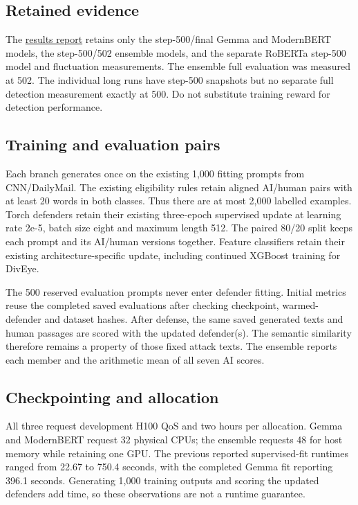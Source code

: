 \subsection{Retained
evidence}\label{record-docs-defender-comparison-md-retained-evidence}

The \href{records/docs/research_results.tex}{results report} retains
only the step-500/final Gemma and ModernBERT models, the step-500/502
ensemble models, and the separate RoBERTa step-500 model and fluctuation
measurements. The ensemble full evaluation was measured at 502. The
individual long runs have step-500 snapshots but no separate full
detection measurement exactly at 500. Do not substitute training reward
for detection performance.

\subsection{Training and evaluation
pairs}\label{record-docs-defender-comparison-md-training-and-evaluation-pairs}

Each branch generates once on the existing 1,000 fitting prompts from
CNN/DailyMail. The existing eligibility rules retain aligned AI/human
pairs with at least 20 words in both classes. Thus there are at most
2,000 labelled examples. Torch defenders retain their existing
three-epoch supervised update at learning rate 2e-5, batch size eight
and maximum length 512. The paired 80/20 split keeps each prompt and its
AI/human versions together. Feature classifiers retain their existing
architecture-specific update, including continued XGBoost training for
DivEye.

The 500 reserved evaluation prompts never enter defender fitting.
Initial metrics reuse the completed saved evaluations after checking
checkpoint, warmed-defender and dataset hashes. After defense, the same
saved generated texts and human passages are scored with the updated
defender(s). The semantic similarity therefore remains a property of
those fixed attack texts. The ensemble reports each member and the
arithmetic mean of all seven AI scores.

\subsection{Checkpointing and
allocation}\label{record-docs-defender-comparison-md-checkpointing-and-allocation}

All three request development H100 QoS and two hours per allocation.
Gemma and ModernBERT request 32 physical CPUs; the ensemble requests 48
for host memory while retaining one GPU. The previous reported
supervised-fit runtimes ranged from 22.67 to 750.4 seconds, with the
completed Gemma fit reporting 396.1 seconds. Generating 1,000 training
outputs and scoring the updated defenders add time, so these
observations are not a runtime guarantee.

